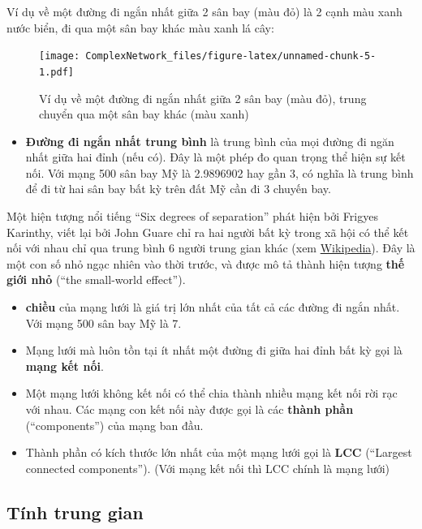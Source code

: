 \documentclass[]{book}
\providecommand{\tightlist}{%
  \setlength{\itemsep}{0pt}\setlength{\parskip}{0pt}}
\begin{document}
Ví dụ về một đường đi ngắn nhất giữa 2 sân bay (màu đỏ) là 2 cạnh màu
xanh nước biển, đi qua một sân bay khác màu xanh lá cây:

\begin{figure}
\centering
\texttt{[image: ComplexNetwork\_files/figure-latex/unnamed-chunk-5-1.pdf]}
\caption{\label{fig:unnamed-chunk-5}Ví dụ về một đường đi ngắn nhất giữa 2
sân bay (màu đỏ), trung chuyển qua một sân bay khác (màu xanh)}
\end{figure}

\begin{itemize}
\tightlist
\item
  \textbf{Đường đi ngắn nhất trung bình} là trung bình của mọi đường đi
  ngăn nhất giữa hai đỉnh (nếu có). Đây là một phép đo quan trọng thể
  hiện sự kết nối. Với mạng 500 sân bay Mỹ là 2.9896902 hay gần 3, có
  nghĩa là trung bình để đi từ hai sân bay bất kỳ trên đất Mỹ cần đi 3
  chuyến bay.
\end{itemize}

Một hiện tượng nổi tiếng ``Six degrees of separation'' phát hiện bởi
Frigyes Karinthy, viết lại bởi John Guare chỉ ra hai người bất kỳ trong
xã hội có thể kết nối với nhau chỉ qua trung bình 6 người trung gian
khác (xem
\href{https://en.wikipedia.org/wiki/Six_degrees_of_separation}{Wikipedia}).
Đây là một con số nhỏ ngạc nhiên vào thời trước, và được mô tả thành
hiện tượng \textbf{thế giới nhỏ} (``the small-world effect'').

\begin{itemize}
\item
  \textbf{chiều} của mạng lưới là giá trị lớn nhất của tất cả các đường
  đi ngắn nhất. Với mạng 500 sân bay Mỹ là 7.
\item
  Mạng lưới mà luôn tồn tại ít nhất một đường đi giữa hai đỉnh bất kỳ
  gọi là \textbf{mạng kết nối}.
\item
  Một mạng lưới không kết nối có thể chia thành nhiều mạng kết nối rời
  rạc với nhau. Các mạng con kết nối này được gọi là các \textbf{thành
  phần} (``components'') của mạng ban đầu.
\item
  Thành phần có kích thước lớn nhất của một mạng lưới gọi là
  \textbf{LCC} (``Largest connected components''). (Với mạng kết nối thì
  LCC chính là mạng lưới)
\end{itemize}

\subsection{Tính trung gian}\label{tinh-trung-gian}
\end{document}
